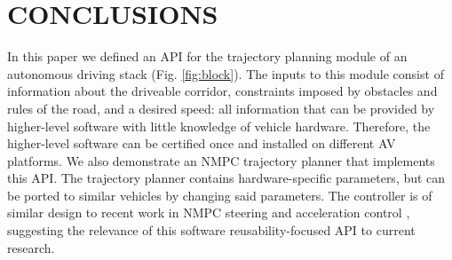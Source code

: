 \documentclass[letterpaper, 10 pt, conference]{ieeeconf}  %
\begin{document}
% 
% 
% 
% 
   
\section{CONCLUSIONS}

In this paper we defined an API for the trajectory planning module of an autonomous driving stack (Fig. \ref{fig:block}). The inputs to this module consist of information about the driveable corridor, constraints imposed by obstacles and rules of the road, and a desired speed: all information that can be provided by higher-level software with little knowledge of vehicle hardware. Therefore, the higher-level software can be certified once and installed on different AV platforms.
We also demonstrate an NMPC trajectory planner that implements this API. The trajectory planner contains hardware-specific parameters, but can be ported to similar vehicles by changing said parameters. The controller is of similar design to recent work in NMPC steering and acceleration control \cite{nmpc_micheli}, suggesting the relevance of this software reusability-focused API to current research.


\addtolength{\textheight}{-12cm}   %
\end{document}
